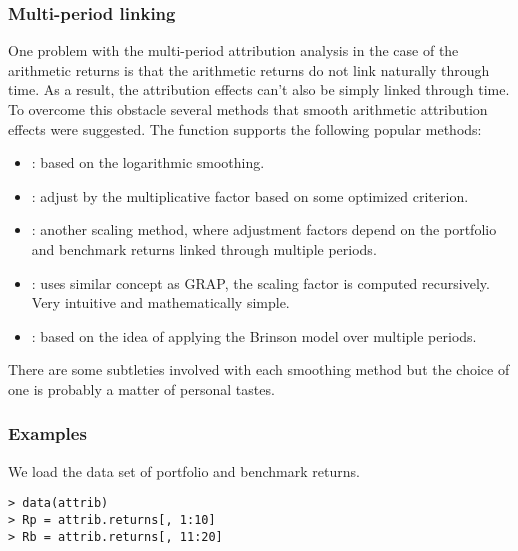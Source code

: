 \documentclass[11pt,a4paper]{article}
\begin{document}
\subsubsection{Multi-period linking}
One problem with the multi-period attribution analysis in the case of the arithmetic returns is that the arithmetic returns do not link naturally through time. As a result, the attribution effects can't also be simply linked through time. To overcome this obstacle several methods that smooth arithmetic attribution effects were suggested. The function supports the following popular methods:
\begin{itemize}
  \item \cite{carino1999combining}: based on the logarithmic smoothing.
  \item \cite{menchero2000optimized}: adjust by the multiplicative factor based on some optimized criterion.
  \item \cite{grap1997}: another scaling method, where adjustment factors depend on the portfolio and benchmark returns linked through multiple periods.
  \item \cite{frongello2002linking}: uses similar concept as GRAP, the scaling factor is computed recursively. Very intuitive and mathematically simple.
  \item \cite{davies2001multiple}: based on the idea of applying the Brinson model over multiple periods.
\end{itemize}
There are some subtleties involved with each smoothing method but the choice of one is probably a matter of personal tastes.

\subsubsection{Examples}
We load the data set of portfolio and benchmark returns.
\begingroup
\fontsize{9pt}{12pt}\selectfont
\begin{verbatim}
> data(attrib)
> Rp = attrib.returns[, 1:10]
> Rb = attrib.returns[, 11:20]
\end{verbatim}
\endgroup
\end{document}
